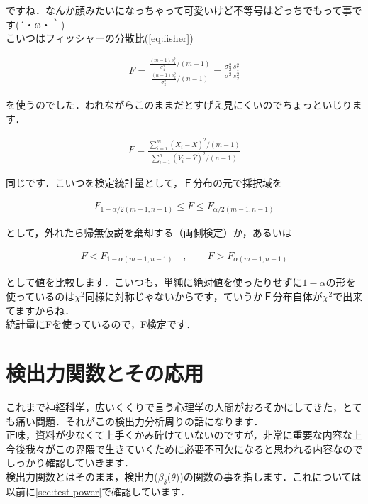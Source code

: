 \documentclass[11pt,a4paper]{ujreport} 	%
\begin{document}
ですね．なんか顔みたいになっちゃって可愛いけど不等号はどっちでもって事です(´・ω・｀)\\

こいつはフィッシャーの分散比(\ref{eq:fisher})

\begin{align}
  F = \frac{\frac{(m-1)s_1^2}{\sigma_1^2} / (m-1)}{\frac{(n-1)s_2^2}{\sigma_2^2} / (n-1)} = \frac{\sigma_2^2}{\sigma_1^2}\frac{s_1^2}{s_2^2}
\end{align}

を使うのでした．われながらこのままだとすげえ見にくいのでちょっといじります．

\begin{align}
  F = \frac{\sum_{i=1}^m (X_i - \bar{X})^2/(m-1)}{\sum_{i=1}^n (Y_i - \bar{Y})^2/(n-1)}
\end{align}

同じです．こいつを検定統計量として，Ｆ分布の元で採択域を

\begin{align}
  F_{1-\alpha/2(m-1,n-1)} \leq F \leq F_{\alpha/2(m-1,n-1)}
\end{align}

として，外れたら帰無仮説を棄却する（両側検定）か，あるいは

\begin{align}
  F < F_{1-\alpha(m-1,n-1)} \quad , \qquad F>F_{\alpha(m-1,n-1)}
\end{align}

として値を比較します．こいつも，単純に絶対値を使ったりせずに$1-\alpha$の形を使っているのは$\chi^2$同様に対称じゃないからです，ていうかＦ分布自体が$\chi^2$で出来てますからね．\\

統計量にFを使っているので，F検定です．

\section{検出力関数とその応用}

これまで神経科学，広いくくりで言う心理学の人間がおろそかにしてきた，とても痛い問題．それがこの検出力分析周りの話になります．\\

正味，資料が少なくて上手くかみ砕けていないのですが，非常に重要な内容な上今後我々がこの界隈で生きていくために必要不可欠になると思われる内容なのでしっかり確認していきます．\\

検出力関数とはそのまま，検出力($\beta_\delta(\theta$))の関数の事を指します．これについては以前に\ref{sec:test-power}で確認しています．
\end{document}
